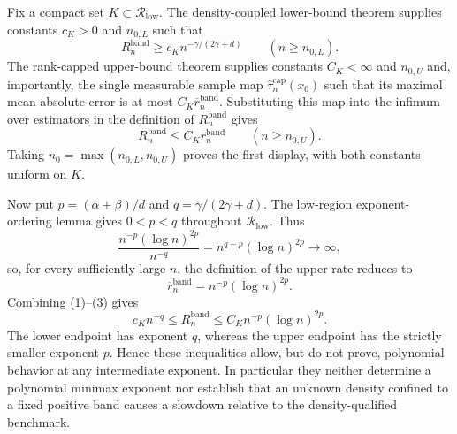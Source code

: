 Fix a compact set \(K\subset\mathcal R_{\mathrm{low}}\).  The density-coupled lower-bound theorem supplies constants \(c_K>0\) and \(n_{0,L}\) such that
\[
R_n^{\mathrm{band}}\ge c_Kn^{-\gamma/(2\gamma+d)}
\qquad(n\ge n_{0,L}).
\tag{1}
\]
The rank-capped upper-bound theorem supplies constants \(C_K<\infty\) and \(n_{0,U}\) and, importantly, the single measurable sample map \(\widehat\tau_n^{\mathrm{cap}}(x_0)\) such that its maximal mean absolute error is at most \(C_K\overline r_n^{\mathrm{band}}\).  Substituting this map into the infimum over estimators in the definition of \(R_n^{\mathrm{band}}\) gives
\[
R_n^{\mathrm{band}}
\le C_K\overline r_n^{\mathrm{band}}
\qquad(n\ge n_{0,U}).
\tag{2}
\]
Taking \(n_0=\max(n_{0,L},n_{0,U})\) proves the first display, with both constants uniform on \(K\).

Now put \(p=(\alpha+\beta)/d\) and \(q=\gamma/(2\gamma+d)\).  The low-region exponent-ordering lemma gives \(0<p<q\) throughout \(\mathcal R_{\mathrm{low}}\).  Thus
\[
\frac{n^{-p}(\log n)^{2p}}{n^{-q}}
=n^{q-p}(\log n)^{2p}\longrightarrow\infty,
\]
so, for every sufficiently large \(n\), the definition of the upper rate reduces to
\[
\overline r_n^{\mathrm{band}}=n^{-p}(\log n)^{2p}.
\tag{3}
\]
Combining (1)--(3) gives
\[
c_Kn^{-q}\le R_n^{\mathrm{band}}
\le C_Kn^{-p}(\log n)^{2p}.
\]
The lower endpoint has exponent \(q\), whereas the upper endpoint has the strictly smaller exponent \(p\).  Hence these inequalities allow, but do not prove, polynomial behavior at any intermediate exponent.  In particular they neither determine a polynomial minimax exponent nor establish that an unknown density confined to a fixed positive band causes a slowdown relative to the density-qualified benchmark.